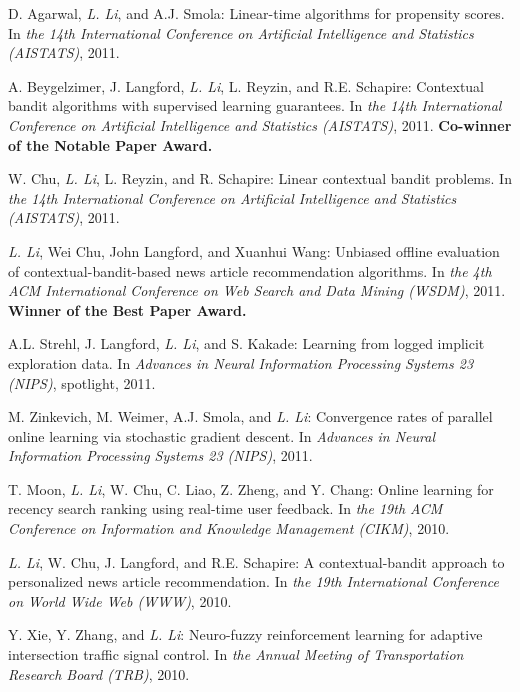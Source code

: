 \documentclass[10pt,twoside,letterpaper]{article}
\newcommand{\selffont}[1]{{\textit{#1}}}
\newcommand{\venuefont}[1]{{\textit{#1}}}
\newcommand{\myself}{\selffont{L. Li}}
\begin{document}
\begin{compactenum}[(C1)]
\item{D. Agarwal, \myself, and A.J. Smola: Linear-time algorithms for propensity scores.  In \venuefont{the 14th International Conference on Artificial Intelligence and Statistics (AISTATS)}, 2011.}

\item{A. Beygelzimer, J. Langford, \myself, L. Reyzin, and R.E. Schapire: Contextual bandit algorithms with supervised learning guarantees.  In \venuefont{the 14th International Conference on Artificial Intelligence and Statistics (AISTATS)}, 2011.  \textbf{Co-winner of the Notable Paper Award.}}

\item{W. Chu, \myself, L. Reyzin, and R. Schapire: Linear contextual bandit problems.  In \venuefont{the 14th International Conference on Artificial Intelligence and Statistics (AISTATS)}, 2011.}

\item{\myself, Wei Chu, John Langford, and Xuanhui Wang: Unbiased offline evaluation of contextual-bandit-based news article recommendation algorithms.  In \venuefont{the 4th ACM International Conference on Web Search and Data Mining (WSDM)}, 2011.  \textbf{Winner of the Best Paper Award.}}

\item{A.L. Strehl, J. Langford, \myself, and S. Kakade: Learning from logged implicit exploration data.  In \venuefont{Advances in Neural Information Processing Systems 23 (NIPS)}, spotlight, 2011.}

\item{M. Zinkevich, M. Weimer, A.J. Smola, and \myself: Convergence rates of parallel online learning via stochastic gradient descent.  In \venuefont{Advances in Neural Information Processing Systems 23 (NIPS)}, 2011.}

\item{T. Moon, \myself, W. Chu, C. Liao, Z. Zheng, and Y. Chang:  Online learning for recency search ranking using real-time user feedback.  In \venuefont{the 19th ACM Conference on Information and Knowledge Management (CIKM)}, 2010.}

\item{\myself, W. Chu, J. Langford, and R.E. Schapire: A contextual-bandit approach to personalized news article recommendation.  In \venuefont{the 19th International Conference on World Wide Web (WWW)}, 2010.}

\item{Y. Xie, Y. Zhang, and \myself: Neuro-fuzzy reinforcement learning for adaptive intersection traffic signal control.  In \venuefont{the Annual Meeting of Transportation Research Board (TRB)}, 2010.}


\end{compactenum}
\end{document}
